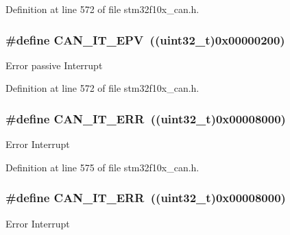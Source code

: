 Definition at line 572 of file stm32f10x\+\_\+can.\+h.

\subsubsection[{\texorpdfstring{C\+A\+N\+\_\+\+I\+T\+\_\+\+E\+PV}{CAN_IT_EPV}}]{\setlength{\rightskip}{0pt plus 5cm}\#define C\+A\+N\+\_\+\+I\+T\+\_\+\+E\+PV~(({\bf uint32\+\_\+t})0x00000200)}\hypertarget{group___c_a_n__interrupts_ga006b7b641d337a599ceac64b483e75dd}{}\label{group___c_a_n__interrupts_ga006b7b641d337a599ceac64b483e75dd}
Error passive Interrupt 

Definition at line 572 of file stm32f10x\+\_\+can.\+h.

\subsubsection[{\texorpdfstring{C\+A\+N\+\_\+\+I\+T\+\_\+\+E\+RR}{CAN_IT_ERR}}]{\setlength{\rightskip}{0pt plus 5cm}\#define C\+A\+N\+\_\+\+I\+T\+\_\+\+E\+RR~(({\bf uint32\+\_\+t})0x00008000)}\hypertarget{group___c_a_n__interrupts_ga65f1781c9165a2e9b5f77f1ed3990741}{}\label{group___c_a_n__interrupts_ga65f1781c9165a2e9b5f77f1ed3990741}
Error Interrupt 

Definition at line 575 of file stm32f10x\+\_\+can.\+h.

\subsubsection[{\texorpdfstring{C\+A\+N\+\_\+\+I\+T\+\_\+\+E\+RR}{CAN_IT_ERR}}]{\setlength{\rightskip}{0pt plus 5cm}\#define C\+A\+N\+\_\+\+I\+T\+\_\+\+E\+RR~(({\bf uint32\+\_\+t})0x00008000)}\hypertarget{group___c_a_n__interrupts_ga65f1781c9165a2e9b5f77f1ed3990741}{}\label{group___c_a_n__interrupts_ga65f1781c9165a2e9b5f77f1ed3990741}
Error Interrupt 

